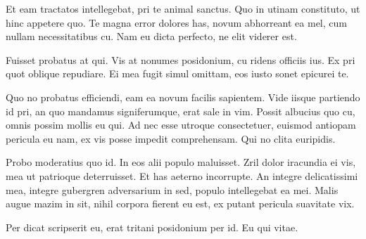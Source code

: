 \documentclass[twocolumn,twoside]{IEEEtran}
\begin{document}
 Et eam tractatos intellegebat, pri te animal sanctus. Quo in utinam constituto, ut hinc appetere quo. Te magna error dolores has, novum abhorreant ea mel, cum nullam necessitatibus cu. Nam eu dicta perfecto, ne elit viderer est.

 Fuisset probatus at qui. Vis at nonumes posidonium, cu ridens officiis ius. Ex pri quot oblique repudiare. Ei mea fugit simul omittam, eos iusto sonet epicurei te.

 Quo no probatus efficiendi, eam ea novum facilis sapientem. Vide iisque partiendo id pri, an quo mandamus signiferumque, erat sale in vim. Possit albucius quo cu, omnis possim mollis eu qui. Ad nec esse utroque consectetuer, euismod antiopam pericula eu nam, ex vis posse impedit comprehensam. Qui no clita euripidis.

 Probo moderatius quo id. In eos alii populo maluisset. Zril dolor iracundia ei vis, mea ut patrioque deterruisset. Et has aeterno incorrupte. An integre delicatissimi mea, integre gubergren adversarium in sed, populo intellegebat ea mei. Malis augue mazim in sit, nihil corpora fierent eu est, ex putant pericula suavitate vix.

 Per dicat scripserit eu, erat tritani posidonium per id. Eu qui vitae.
\end{document}
